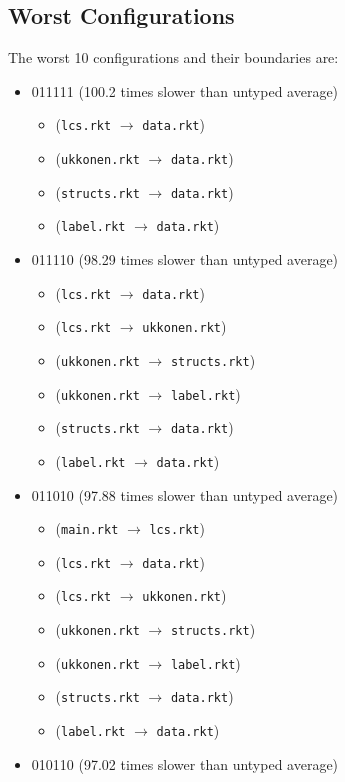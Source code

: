 \documentclass{article}
\newcommand{\mono}[1]{\texttt{#1}}
\begin{document}
\subsection{Worst Configurations}
The worst 10 configurations and their boundaries are:
\begin{itemize}
\item 011111 (100.2 times slower than untyped average)
  \begin{itemize}
  \item (\mono{lcs.rkt} $\rightarrow$ \mono{data.rkt})
  \item (\mono{ukkonen.rkt} $\rightarrow$ \mono{data.rkt})
  \item (\mono{structs.rkt} $\rightarrow$ \mono{data.rkt})
  \item (\mono{label.rkt} $\rightarrow$ \mono{data.rkt})
  \end{itemize}
\item 011110 (98.29 times slower than untyped average)
  \begin{itemize}
  \item (\mono{lcs.rkt} $\rightarrow$ \mono{data.rkt})
  \item (\mono{lcs.rkt} $\rightarrow$ \mono{ukkonen.rkt})
  \item (\mono{ukkonen.rkt} $\rightarrow$ \mono{structs.rkt})
  \item (\mono{ukkonen.rkt} $\rightarrow$ \mono{label.rkt})
  \item (\mono{structs.rkt} $\rightarrow$ \mono{data.rkt})
  \item (\mono{label.rkt} $\rightarrow$ \mono{data.rkt})
  \end{itemize}
\item 011010 (97.88 times slower than untyped average)
  \begin{itemize}
  \item (\mono{main.rkt} $\rightarrow$ \mono{lcs.rkt})
  \item (\mono{lcs.rkt} $\rightarrow$ \mono{data.rkt})
  \item (\mono{lcs.rkt} $\rightarrow$ \mono{ukkonen.rkt})
  \item (\mono{ukkonen.rkt} $\rightarrow$ \mono{structs.rkt})
  \item (\mono{ukkonen.rkt} $\rightarrow$ \mono{label.rkt})
  \item (\mono{structs.rkt} $\rightarrow$ \mono{data.rkt})
  \item (\mono{label.rkt} $\rightarrow$ \mono{data.rkt})
  \end{itemize}
\item 010110 (97.02 times slower than untyped average)

\end{itemize}
\end{document}
